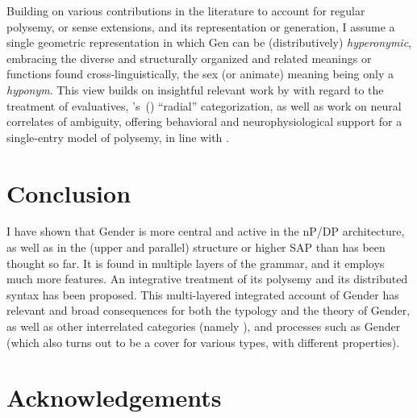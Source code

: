 Building on various contributions in the literature to account for regular
polysemy, or sense extensions, and its representation or generation, I assume a
single geometric representation in which Gen can be (distributively)
\textit{hyperonymic}, embracing the diverse and structurally organized and
related meanings or functions found cross-linguistically, the sex (or animate)
meaning being only a \textit{hyponym}. This view builds on insightful relevant
work by \citet{DresslerEtAl1994,Jurafsky1996,Kortvelyessy2014,GrandiEtAl2015}
with regard to the  treatment of evaluatives,
\citeauthor{Lakoff1987}'s~(\citeyear{Lakoff1987}) ``radial'' categorization, as
well as work on neural correlates of  ambiguity, offering behavioral
and neurophysiological support for a single-entry model of polysemy, in line
with \citet{BerettaEtAl2005,Marantz2005,PylkkanenEtAl2006}.

\section{Conclusion}\label{sec:fassi:conclusion}

I have shown that Gender is more central and active in the nP/DP architecture,
as well as in the (upper and parallel)  structure or higher SAP than has been
thought so far. It is found in multiple layers of the grammar, and it employs
much more  features. An integrative treatment of its polysemy and its
distributed syntax has been proposed. This multi-layered integrated account of
Gender has relevant and broad consequences for both the typology and the theory
of Gender, as well as other interrelated categories (namely ), and
processes such as Gender  (which also turns out to be a cover for
various types, with different properties).

\section*{Acknowledgements}

